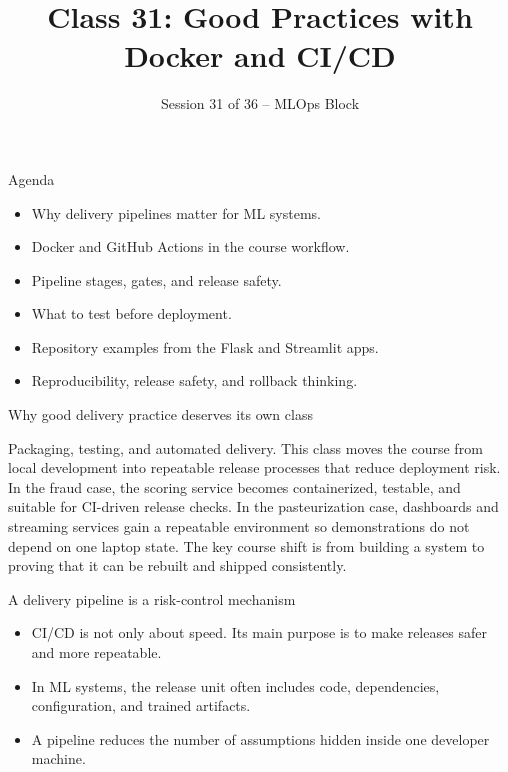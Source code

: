 

\title{Class 31: Good Practices with Docker and CI/CD}
\subtitle{Session 31 of 36 -- MLOps Block}
\author{\coursename}
\date{}



\frame{\titlepage \coursefooter}

\begin{frame}{Agenda}
\begin{itemize}
\item Why delivery pipelines matter for ML systems.
\item Docker and GitHub Actions in the course workflow.
\item Pipeline stages, gates, and release safety.
\item What to test before deployment.
\item Repository examples from the Flask and Streamlit apps.
\item Reproducibility, release safety, and rollback thinking.
\end{itemize}
\coursefooter
\end{frame}

\begin{frame}{Why good delivery practice deserves its own class}
\coursefooter
\end{frame}

\coursecontextframe
{Packaging, testing, and automated delivery.}
{This class moves the course from local development into repeatable release processes that reduce deployment risk.}
{In the fraud case, the scoring service becomes containerized, testable, and suitable for CI-driven release checks.}
{In the pasteurization case, dashboards and streaming services gain a repeatable environment so demonstrations do not depend on one laptop state.}
{The key course shift is from building a system to proving that it can be rebuilt and shipped consistently.}

\begin{frame}{A delivery pipeline is a risk-control mechanism}
\begin{itemize}
\item CI/CD is not only about speed. Its main purpose is to make releases safer and more repeatable.
\item In ML systems, the release unit often includes code, dependencies, configuration, and trained artifacts.
\item A pipeline reduces the number of assumptions hidden inside one developer machine.
\end{itemize}
\coursefooter
\end{frame}


